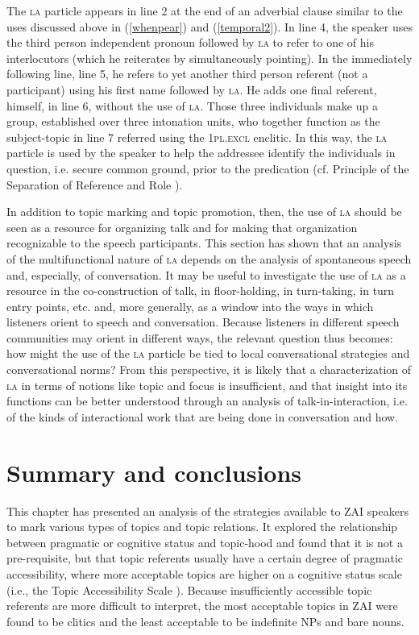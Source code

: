 \z
The \textsc{la} particle appears in line 2 at the end of an adverbial clause similar to the uses discussed above in (\ref{whenpear}) and (\ref{temporal2}). In line 4, the speaker uses the third person independent pronoun followed by \textsc{la} to refer to one of his interlocutors (which he reiterates by simultaneously pointing). In the immediately following line, line 5, he refers to yet another third person referent (not a participant) using his first name followed by \textsc{la}. He adds one final referent, himself, in line 6, without the use of \textsc{la}. Those three individuals make up a group, established over three intonation units, who together function as the subject-topic in line 7 referred using the 1\textsc{pl.excl} enclitic. In this way, the \textsc{la} particle is used by the speaker to help the addressee identify the individuals in question, i.e. secure common ground, prior to the predication (cf. Principle of the Separation of Reference and Role \citep{lambrecht1994}).

In addition to topic marking and topic promotion, then, the use of \textsc{la} should be seen as a resource for organizing talk and for making that organization recognizable to the speech participants. This section has shown that an analysis of the multifunctional nature of \textsc{la} depends on the analysis of spontaneous speech and, especially, of conversation. It may be useful to investigate the use of \textsc{la} as a resource in the co-construction of talk, in floor-holding, in turn-taking, in turn entry points, etc. and, more generally, as a window into the ways in which listeners orient to speech and conversation. Because listeners in different speech communities may orient in different ways, the relevant question thus becomes: how might the use of the \textsc{la} particle be tied to local conversational strategies and conversational norms? From this perspective, it is likely that a characterization of \textsc{la} in terms of notions like topic and focus is insufficient, and that insight into its functions can be better understood through an analysis of talk-in-interaction, i.e. of the kinds of interactional work that are being done in conversation and how.


\section{Summary and conclusions}

This chapter has presented an analysis of the strategies available to ZAI speakers to mark various types of topics and topic relations. It explored the relationship between pragmatic or cognitive status and topic-hood and found that it is not a pre-requisite, but that topic referents usually have a certain degree of pragmatic accessibility, where more acceptable topics are higher on a cognitive status scale (i.e., the Topic Accessibility Scale \citep{lambrecht1994}). Because insufficiently accessible topic referents are more difficult to interpret, the most acceptable topics in ZAI were found to be clitics and the least acceptable to be indefinite NPs and bare nouns.

